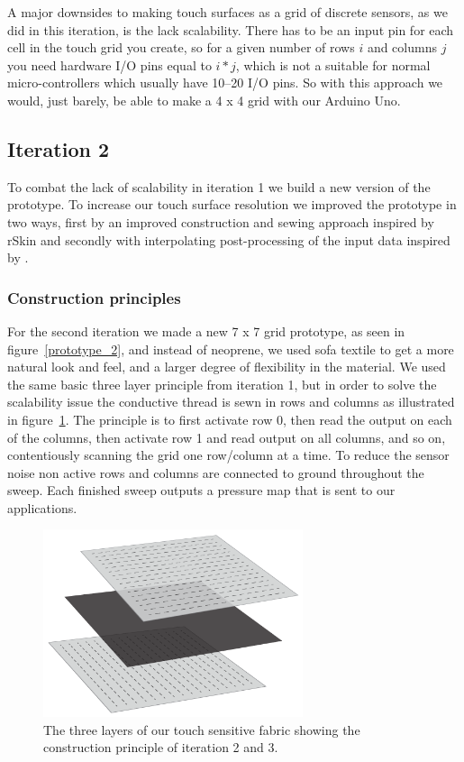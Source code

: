 A major downsides to making touch surfaces as a grid of discrete sensors, as we did in this iteration, is the lack scalability.
There has to be an input pin for each cell in the touch grid you create, so for a given number of rows \(i\) and columns \(j\) you need hardware I/O pins equal to \(i*j\), which is not a suitable for normal micro-controllers which usually have 10--20 I/O pins.
So with this approach we would, just barely, be able to make a 4 x 4 grid with our Arduino Uno. 

\subsection{Iteration 2}
To combat the lack of scalability in iteration 1 we build a new version of the prototype.
To increase our touch surface resolution we improved the prototype in two ways, first by an improved construction and sewing approach inspired by rSkin \citep{rSsininstructables,rskinplusea} and secondly with interpolating post-processing of the input data inspired by \citep{rosenberg2009unmousepad}. 

\subsubsection{Construction principles}
For the second iteration we made a new 7 x 7 grid prototype, as seen in figure~\ref{prototype_2}, and instead of neoprene, we used sofa textile to get a more natural look and feel, and a larger degree of flexibility in the material.
We used the same basic three layer principle from iteration 1, but in order to solve the scalability issue the conductive thread is sewn in rows and columns as illustrated in figure~\ref{layers_iteration2_and_3}.
The principle is to first activate row 0, then read the output on each of the columns, then activate row 1 and read output on all columns, and so on, contentiously scanning the grid one row/column at a time.
To reduce the sensor noise non active rows and columns are connected to ground throughout the sweep.
Each finished sweep outputs a pressure map that is sent to our applications.

\begin{figure}[h]
	\centering
  		\includegraphics[width=3in]{figures/touch/layers_it_23}
	\caption[The three layers of our touch sensitive fabric, iteration 2 and 3.]
   {The three layers of our touch sensitive fabric showing the construction principle of iteration 2 and 3.}
   \label{layers_iteration2_and_3}
\end{figure}


